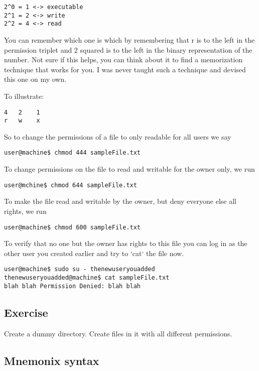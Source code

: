 \documentclass[10pt]{article}
\begin{document}
\begin{verbatim}
2^0 = 1 <-> executable
2^1 = 2 <-> write
2^2 = 4 <-> read
\end{verbatim}

You can remember which one is which by remembering that r is to the left in the
permission triplet and 2 squared is to the left in the binary representation of the number. Not sure if this helps, you can think about it to find a memorization technique that works for you. I was never taught such a technique and devised this one on my own.

To illustrate:
\begin{verbatim}
4   2    1
r   w    x
\end{verbatim}

So to change the permissions of a file to only readable for all users we say 

\begin{lstlisting}[style=term]
user@machine$ chmod 444 sampleFile.txt
\end{lstlisting}

To change permissions on the file to read and writable for the owner only, we run

\begin{lstlisting}[style=term]
user@mchine$ chmod 644 sampleFile.txt
\end{lstlisting}

To make the file read and writable by the owner, but deny everyone else all rights, we run

\begin{lstlisting}[style=term]
user@machine$ chmod 600 sampleFile.txt
\end{lstlisting}

To verify that no one but the owner has rights to this file you can log in as the other user you created earlier and try to `cat` the file now.

\begin{lstlisting}[style=term]
user@machine$ sudo su - thenewuseryouadded
thenewuseryouadded@machine$ cat sampleFile.txt
blah blah Permission Denied: blah blah
\end{lstlisting}

\subsection{{\color{red}Exercise }}
Create a dummy directory. Create files in it with all different permissions.


\subsection{ Mnemonix syntax }
\end{document}
